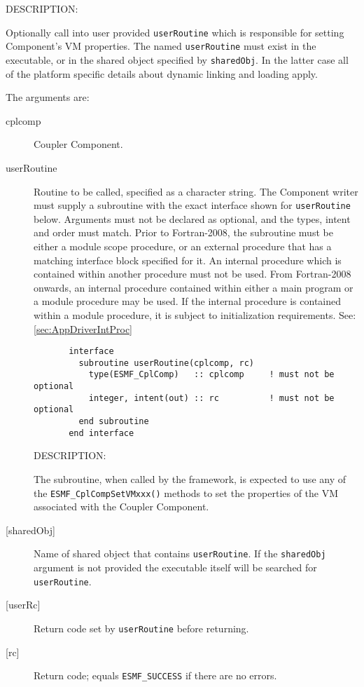 {\sf DESCRIPTION:\\ }


   Optionally call into user provided {\tt userRoutine} which is responsible
   for setting Component's VM properties. The named
   {\tt userRoutine} must exist in the executable, or in the shared object
   specified by {\tt sharedObj}. In the latter case all of the platform
   specific details about dynamic linking and loading apply.
  
   The arguments are:
   \begin{description}
   \item[cplcomp]
     Coupler Component.
   \item[userRoutine]
     Routine to be called, specified as a character string.
     The Component writer must supply a subroutine with the exact interface
     shown for {\tt userRoutine} below. Arguments must not be declared
     as optional, and the types, intent and order must match.
     Prior to Fortran-2008, the subroutine must be either a module scope procedure,
     or an external procedure that has a matching interface block specified for it.
     An internal procedure which is contained within another procedure must not be used.
     From Fortran-2008 onwards, an internal procedure contained within either a main program
     or a module procedure may be used.  If the internal procedure is contained within a
     module procedure, it is subject to initialization requirements.  See: \ref{sec:AppDriverIntProc}
  
\begin{verbatim}       interface
         subroutine userRoutine(cplcomp, rc)
           type(ESMF_CplComp)   :: cplcomp     ! must not be optional
           integer, intent(out) :: rc          ! must not be optional
         end subroutine
       end interface\end{verbatim}
{\sf DESCRIPTION:\\ }


     The subroutine, when called by the framework, is expected to use any of the
     {\tt ESMF\_CplCompSetVMxxx()} methods to set the properties of the VM
     associated with the Coupler Component.
   \item[{[sharedObj]}]
     Name of shared object that contains {\tt userRoutine}. If the
     {\tt sharedObj} argument is not provided the executable itself will be
     searched for {\tt userRoutine}.
   \item[{[userRc]}]
     Return code set by {\tt userRoutine} before returning.
   \item[{[rc]}]
     Return code; equals {\tt ESMF\_SUCCESS} if there are no errors.
   \end{description}
   
